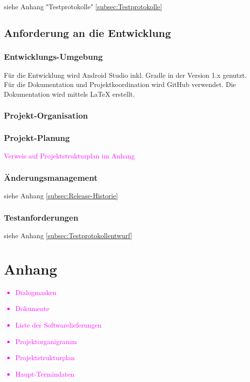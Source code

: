 siehe Anhang "Testprotokolle" \ref{subsec:Testprotokolle}



\subsection{\textbf{Anforderung an die Entwicklung}}

\subsubsection{Entwicklungs-Umgebung}
Für die Entwicklung wird Android Studio inkl. Gradle in der Version 1.x genutzt. Für die Dokumentation und Projektkoordination wird GitHub verwendet.
Die Dokumentation wird mittels \LaTeX{} erstellt.



\subsubsection{Projekt-Organisation}



\subsubsection{Projekt-Planung}
\textcolor{magenta}{Verweis auf Projektstrukturplan im Anhang}

\subsubsection{Änderungsmanagement}
siehe Anhang \ref{subsec:Release-Historie}

\subsubsection{Testanforderungen}
siehe Anhang \ref{subsec:Testprotokollentwurf}



\section{Anhang}

\textcolor{magenta}{
\begin{itemize}
	\item Dialogmasken
	\item Dokumente
	\item Liste der Softwarelieferungen
	\item Projektorganigramm
	\item Projektstrukturplan
	\item Haupt-Termindaten
\end{itemize}
}
